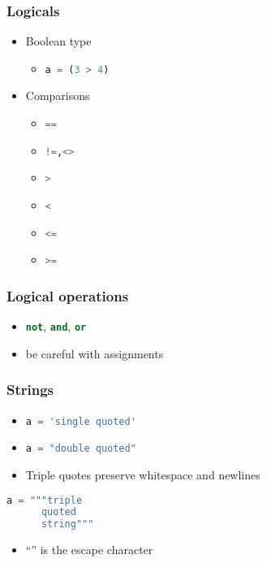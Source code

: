 \documentclass[xcolor=table,10pt,final]{beamer}
\begin{document}
\begin{frame}
  \frametitle{Logicals}
  \begin{itemize}
    \item Boolean type
      \begin{itemize}
        \item \lstinline[language=Python]|a = (3 > 4)|
      \end{itemize}
    \item Comparisons
      \begin{itemize}
        \item \lstinline[language=Python]|==|
        \item \lstinline[language=Python]|!=,<>|
        \item \lstinline[language=Python]|>|
        \item \lstinline[language=Python]|<|
        \item \lstinline[language=Python]|<=|
        \item \lstinline[language=Python]|>=|
      \end{itemize}
  \end{itemize}
\end{frame}

\begin{frame}
  \frametitle{Logical operations}
  \begin{itemize}
    \item \lstinline[language=Python]|not|, \lstinline[language=Python]|and|, \lstinline[language=Python]|or|
    \item be careful with assignments
  \end{itemize}
\end{frame}


\begin{frame}[fragile]
  \frametitle{Strings}
  \begin{itemize}
    \item \lstinline[language=Python]|a = 'single quoted'|
    \item \lstinline[language=Python]|a = "double quoted"|
    \item Triple quotes preserve whitespace and newlines
  \end{itemize}
      \begin{lstlisting}[language=Python]
      a = """triple
      quoted
      string"""
      \end{lstlisting}
      \begin{itemize}
    \item ``'' is the escape character
  \end{itemize}
\end{frame}
\end{document}
